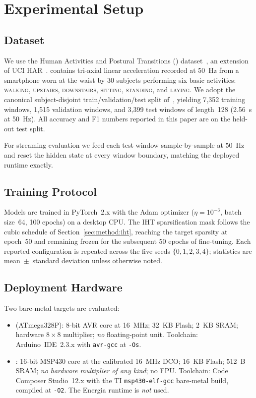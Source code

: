 \section{Experimental Setup}
\label{sec:setup}

\subsection{Dataset}

We use the Human Activities and Postural Transitions (\hapt{})
dataset~\cite{reyes2015transition}, an extension of UCI
HAR~\cite{anguita2013public}. \hapt{} contains tri-axial linear
acceleration recorded at 50~Hz from a smartphone worn at the waist
by 30 subjects performing six basic activities:
\textsc{walking}, \textsc{upstairs}, \textsc{downstairs},
\textsc{sitting}, \textsc{standing}, and \textsc{laying}.
We adopt the canonical subject-disjoint train/validation/test split
of~\cite{reyes2015transition}, yielding 7{,}352 training windows,
1{,}515 validation windows, and 3{,}399 test windows of length~128
(2.56~s at 50~Hz). All accuracy and F1 numbers reported in this
paper are on the held-out test split.

For streaming evaluation we feed each test window sample-by-sample
at 50~Hz and reset the hidden state at every window boundary,
matching the deployed runtime exactly.

\subsection{Training Protocol}

Models are trained in PyTorch~2.x with the
Adam optimizer ($\eta{=}10^{-3}$, batch size~64, 100 epochs)
on a desktop CPU. The IHT sparsification mask follows the cubic
schedule of Section~\ref{sec:method:iht}, reaching the target
sparsity at epoch~50 and remaining frozen for the subsequent 50
epochs of fine-tuning. Each reported configuration is repeated
across the five seeds $\{0, 1, 2, 3, 4\}$; statistics are
mean~$\pm$~standard deviation unless otherwise noted.

\subsection{Deployment Hardware}

Two bare-metal targets are evaluated:
\begin{itemize}
\item \textbf{\arduino{}} (ATmega328P): 8-bit AVR core at
16~MHz; 32~KB Flash; 2~KB SRAM; hardware $8{\times}8$ multiplier;
\emph{no} floating-point unit. Toolchain: Arduino~IDE~2.3.x
with \texttt{avr-gcc} at \texttt{-Os}.
\item \textbf{\msp{}}: 16-bit MSP430 core at the calibrated
16~MHz DCO; 16~KB Flash; 512~B SRAM;
\emph{no hardware multiplier of any kind}; no FPU. Toolchain:
Code Composer Studio~12.x with the TI \texttt{msp430-elf-gcc}
bare-metal build, compiled at \texttt{-O2}. The Energia runtime
is \emph{not} used.
\end{itemize}

